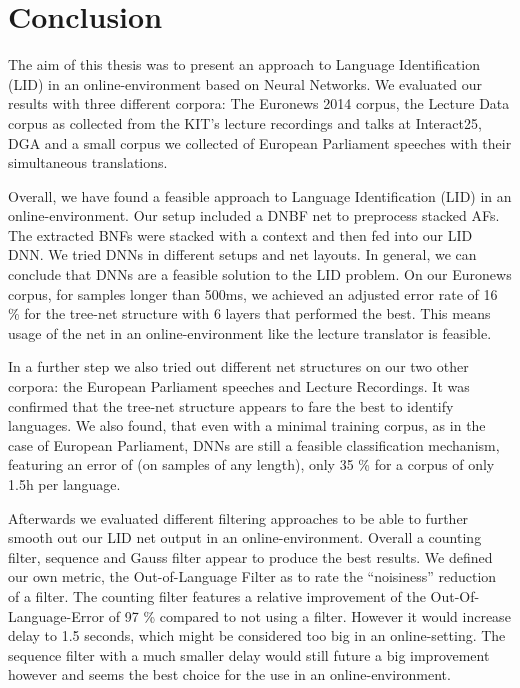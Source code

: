 
\chapter{Conclusion}
\label{ch:Conclusion}

The aim of this thesis was to present an approach to Language Identification (LID) in an online-environment based on Neural Networks. We evaluated our results with three different corpora: The Euronews 2014 corpus, the Lecture Data corpus as collected from the KIT's lecture recordings and talks at Interact25, DGA and a small corpus we collected of European Parliament speeches with their simultaneous translations.

Overall, we have found a feasible approach to Language Identification (LID) in an online-environment. Our setup included a DNBF net to preprocess stacked AFs. The extracted BNFs were stacked with a context and then fed into our LID DNN.  We tried DNNs in different setups and net layouts. In general, we can conclude that DNNs are a feasible solution to the LID problem. On our Euronews corpus, for samples longer than 500ms, we achieved an adjusted error rate of 16 \% for the tree-net structure with 6 layers that performed the best. This means usage of the net in an online-environment like the lecture translator is feasible.

In a further step we also tried out different net structures on our two other corpora: the European Parliament speeches and Lecture Recordings. It was confirmed that the tree-net structure appears to fare the best to identify languages. We also found, that even with a minimal training corpus, as in the case of European Parliament, DNNs are still a feasible classification mechanism, featuring an error of (on samples of any length), only 35 \% for a corpus of only 1.5h per language. 

Afterwards we evaluated different filtering approaches to be able to further smooth out our LID net output in an online-environment. Overall a counting filter, sequence and Gauss filter appear to produce the best results. We defined our own metric, the Out-of-Language Filter as to rate the ``noisiness'' reduction of a filter. The counting filter features a relative improvement of the Out-Of-Language-Error of 97 \% compared to not using a filter. However it would increase delay to 1.5 seconds, which might be considered too big in an online-setting. The sequence filter with a much smaller delay would still future a big improvement however and seems the best choice for the use in an online-environment.

